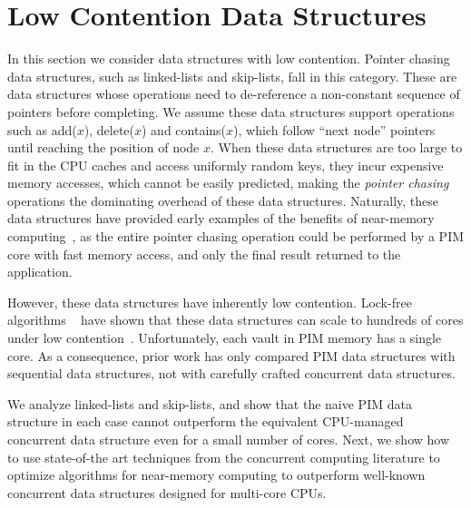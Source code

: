 
\section{Low Contention Data Structures}
\label{section:pointer_chasing}

In this section we consider data structures with low contention. 
Pointer chasing data structures, 
such as linked-lists and skip-lists, fall in this category.  
These are data structures whose operations  
need to de-reference a non-constant sequence of pointers before completing. 
We assume these data structures support operations 
such as add($x$), delete($x$) and contains($x$), which follow ``next node'' pointers until 
reaching the position of node $x$.
When these data structures are too large to fit in the CPU caches 
and access uniformly random keys,
they incur expensive memory accesses, which cannot be easily predicted, 
making the \emph{pointer chasing} operations the dominating overhead of these data structures.
Naturally, these data structures have provided early examples of the benefits of near-memory 
computing~\cite{hsieh2016accelerating, Hashemi:2016}, 
as the entire pointer chasing operation could be performed by a PIM core with fast memory access, 
and only the final result returned to the application. 

However, these data structures have inherently low contention. 
Lock-free algorithms
~\cite{practicallf, skiplists-concpugh, valois, Herlihy08}
have shown that these data structures can scale to hundreds of cores under low contention~\cite{nodereplication}.
Unfortunately, each vault in 
PIM memory has a single core. 
As a consequence, prior work has only compared PIM data structures with sequential data structures, 
not with carefully crafted concurrent data structures.

We analyze linked-lists and skip-lists, and show that the naive PIM data structure in each case cannot 
outperform the equivalent CPU-managed concurrent data structure even for a small number of cores. 
Next, we show how to use state-of-the art techniques from the concurrent computing literature to 
optimize algorithms for near-memory computing to outperform well-known concurrent data 
structures designed for multi-core CPUs. 

